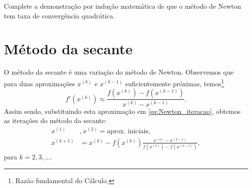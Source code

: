 \begin{exer}\label{ex:Newton_analise_conv}
  Complete a demonstração por indução matemática de que o método de Newton tem taxa de convergência quadrática.
\end{exer}

\section{Método da secante}\label{cap_eq1d_sec_secante}

O método da secante é uma variação do método de Newton. Observemos que para duas aproximações $x^{(k)}$ e $x^{(k-1)}$ suficientemente próximas, temos\footnote{Razão fundamental do Cálculo.}
\begin{equation}
  f'(x^{(k)}) \approx \frac{f(x^{(k)})-f(x^{(k-1)})}{x^{(k)}-x^{(k-1)}}.
\end{equation}
Assim sendo, substituindo esta aproximação em \eqref{eq:Newton_iteracao}, obtemos as iterações do método da secante:
\begin{align}
  x^{(1)}&, x^{(2)} = \text{aprox. iniciais},\\
  x^{(k+1)} &= x^{(k)} - f(x^{(k)})\frac{x^{(k)}-x^{(k-1)}}{f(x^{(k)})-f(x^{(k-1)})},
\end{align}
para $k=2,3,\ldots$.

